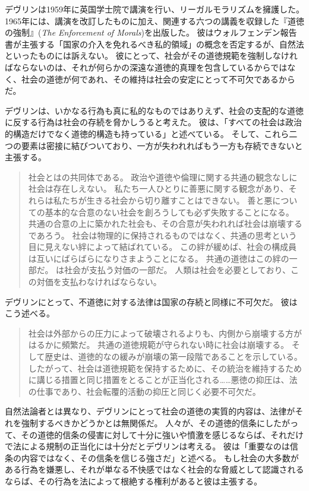 \documentclass[paper=a4,book,openany]{jlreq}
\newcommand{\ig}[1]{}           %
\begin{document}
デヴリン\ig{Patrick Devlin}は1959年に英国学士院で講演を行い、リーガルモラリズムを擁護した。
1965年には、講演を改訂したものに加え、関連する六つの講義を収録した『道徳の強制』(\emph{The Enforcement of Morals})を出版した。
彼はウォルフェンデン報告書が主張する「国家の介入を免れるべき私的領域」の概念を否定するが、自然法といったものには訴えない。
彼にとって、社会がその道徳規範を強制しなければならないのは、それが何らかの深遠な道徳的真理を包含しているからではなく、社会の道徳が何であれ、その維持は社会の安定にとって不可欠であるからだ。

デヴリン\ig{Patrick Devlin}は、いかなる行為も真に私的なものではありえず、社会の支配的な道徳に反する行為は社会の存続を脅かしうると考えた。
彼は、「すべての社会は政治的構造だけでなく道徳的構造も持っている」と述べている\citep[p.9]{devlin65:_enfor_moral}。
そして、これら二つの要素は密接に結びついており、一方が失われればもう一方も存続できないと主張する。

\begin{quote}
社会とはの共同体である。
政治や道徳や倫理に関する共通の観念なしに社会は存在しえない。
私たち一人ひとりに善悪に関する観念があり、それらは私たちが生きる社会から切り離すことはできない。
善と悪についての基本的な合意のない社会を創ろうしても必ず失敗することになる。
共通の合意の上に築かれた社会も、その合意が失われれば社会は崩壊するであろう。
社会は物理的に保持されるものではなく、共通の思考という目に見えない絆によって結ばれている。
この絆が緩めば、社会の構成員は互いにばらばらになりさまようことになる。
共通の道徳はこの絆の一部だ。
は社会が支払う対価の一部だ。
人類は社会を必要としており、この対価を支払わなければならない。
\citep[p.10]{devlin65:_enfor_moral}
\end{quote}

デヴリン\ig{Patrick Devlin}にとって、不道徳に対する法律は国家の存続と同様に不可欠だ。
彼はこう述べる。

\begin{quote}
社会は外部からの圧力によって破壊されるよりも、内側から崩壊する方がはるかに頻繁だ。
共通の道徳規範が守られない時に社会は崩壊する。
そして歴史は、道徳的なの緩みが崩壊の第一段階であることを示している。
したがって、社会は道徳規範を保持するために、その統治を維持するために講じる措置と同じ措置をとることが正当化される……悪徳の抑圧は、法の仕事であり、社会転覆的活動の抑圧と同じく必要不可欠だ。
\citep[p.36]{devlin65:_enfor_moral}
\end{quote}

自然法論者とは異なり、デヴリン\ig{Patrick Devlin}にとって社会の道徳の実質的内容は、法律がそれを強制するべきかどうかとは無関係だ。
人々が、その道徳的信条にしたがって、その道徳的信条の侵害に対して十分に強いや憤激を感じるならば、それだけで法による規制の正当化には十分だとデヴリン\ig{Patrick Devlin}は考える。
彼は「重要なのは信条の内容ではなく、その信条を信じる強さだ」と述べる。
もし社会の大多数がある行為を嫌悪し、それが単なる不快感ではなく社会的な脅威として認識されるならば、その行為を法によって根絶する権利があると彼は主張する。
\end{document}
